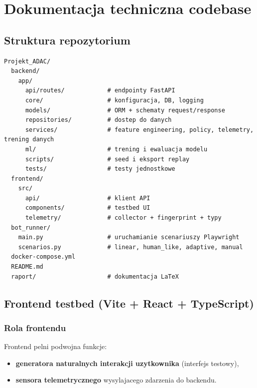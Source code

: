 ﻿\section{Dokumentacja techniczna codebase}

\subsection{Struktura repozytorium}
\begin{lstlisting}[style=reportcode]
Projekt_ADAC/
  backend/
    app/
      api/routes/            # endpointy FastAPI
      core/                  # konfiguracja, DB, logging
      models/                # ORM + schematy request/response
      repositories/          # dostep do danych
      services/              # feature engineering, policy, telemetry, trening danych
      ml/                    # trening i ewaluacja modelu
      scripts/               # seed i eksport replay
      tests/                 # testy jednostkowe
  frontend/
    src/
      api/                   # klient API
      components/            # testbed UI
      telemetry/             # collector + fingerprint + typy
  bot_runner/
    main.py                  # uruchamianie scenariuszy Playwright
    scenarios.py             # linear, human_like, adaptive, manual
  docker-compose.yml
  README.md
  raport/                    # dokumentacja LaTeX
\end{lstlisting}

\subsection{Frontend testbed (Vite + React + TypeScript)}
\subsubsection{Rola frontendu}
Frontend pelni podwojna funkcje:
\begin{itemize}
  \item \textbf{generatora naturalnych interakcji uzytkownika} (interfejs testowy),
  \item \textbf{sensora telemetrycznego} wysylajacego zdarzenia do backendu.
\end{itemize}

